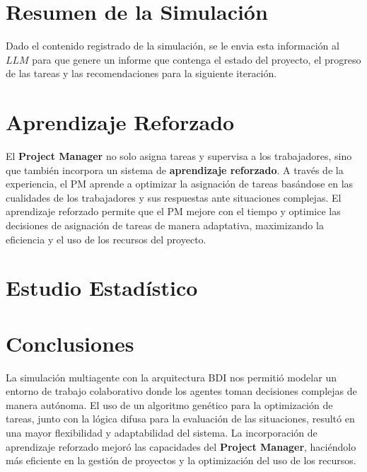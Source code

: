 \documentclass[a4paper, 12pt]{article}
\begin{document}
\section{Resumen de la Simulación}
Dado el contenido registrado de la simulación, se le envia esta información al $LLM$ para que genere un informe que contenga el estado del proyecto, el progreso de las tareas y las recomendaciones para la siguiente iteración.

\section{Aprendizaje Reforzado}
El \textbf{Project Manager} no solo asigna tareas y supervisa a los trabajadores, sino que también incorpora un sistema de \textbf{aprendizaje reforzado}. A través de la experiencia, el PM aprende a optimizar la asignación de tareas basándose en las cualidades de los trabajadores y sus respuestas ante situaciones complejas. El aprendizaje reforzado permite que el PM mejore con el tiempo y optimice las decisiones de asignación de tareas de manera adaptativa, maximizando la eficiencia y el uso de los recursos del proyecto.

\section{Estudio Estad\'istico}

\section{Conclusiones}
La simulación multiagente con la arquitectura BDI nos permitió modelar un entorno de trabajo colaborativo donde los agentes toman decisiones complejas de manera autónoma. El uso de un algoritmo genético para la optimización de tareas, junto con la lógica difusa para la evaluación de las situaciones, resultó en una mayor flexibilidad y adaptabilidad del sistema. La incorporación de aprendizaje reforzado mejoró las capacidades del \textbf{Project Manager}, haciéndolo más eficiente en la gestión de proyectos y la optimización del uso de los recursos.
\end{document}
